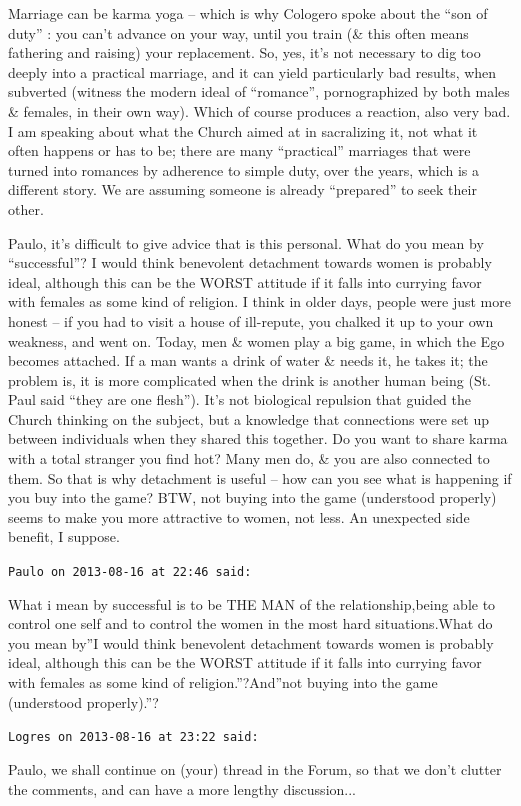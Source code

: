\begin{footnotesize}
\begin{sffamily}
Marriage can be karma yoga -- which is why Cologero spoke about the ``son of duty'' : you can't advance on your way, until you train (\& this often means fathering and raising) your replacement. So, yes, it's not necessary to dig too deeply into a practical marriage, and it can yield particularly bad results, when subverted (witness the modern ideal of ``romance'', pornographized by both males \& females, in their own way). Which of course produces a reaction, also very bad. I am speaking about what the Church aimed at in sacralizing it, not what it often happens or has to be; there are many ``practical'' marriages that were turned into romances by adherence to simple duty, over the years, which is a different story. We are assuming someone is already ``prepared'' to seek their other.

Paulo, it's difficult to give advice that is this personal. What do you mean by ``successful''? I would think benevolent detachment towards women is probably ideal, although this can be the WORST attitude if it falls into currying favor with females as some kind of religion. I think in older days, people were just more honest -- if you had to visit a house of ill-repute, you chalked it up to your own weakness, and went on. Today, men \& women play a big game, in which the Ego becomes attached. If a man wants a drink of water \& needs it, he takes it; the problem is, it is more complicated when the drink is another human being (St. Paul said ``they are one flesh''). It's not biological repulsion that guided the Church thinking on the subject, but a knowledge that connections were set up between individuals when they shared this together. Do you want to share karma with a total stranger you find hot? Many men do, \& you are also connected to them. So that is why detachment is useful -- how can you see what is happening if you buy into the game? BTW, not buying into the game (understood properly) seems to make you more attractive to women, not less. An unexpected side benefit, I suppose.

\hfill

\texttt{Paulo on 2013-08-16 at 22:46 said:}

What i mean by successful is to be THE MAN of the relationship,being able to control one self and to control the women in the most hard situations.What do you mean by''I would think benevolent detachment towards women is probably ideal, although this can be the WORST attitude if it falls into currying favor with females as some kind of religion.''?And''not buying into the game (understood properly).''?

\hfill

\texttt{Logres on 2013-08-16 at 23:22 said:}

Paulo, we shall continue on (your) thread in the Forum, so that we don't clutter the comments, and can have a more lengthy discussion... 

\hfill

\end{sffamily}
\end{footnotesize}

